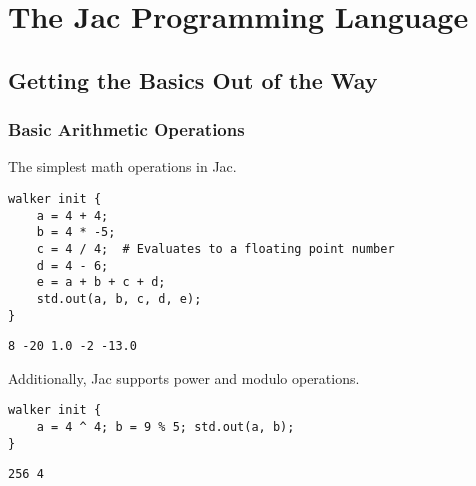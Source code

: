 \chapter{The Jac Programming Language}
\section{Getting the Basics Out of the Way}
\subsection{Basic Arithmetic Operations}
The simplest math operations in Jac.


\begin{lstlisting}[caption={Basic arithmetic operations}]
walker init {
    a = 4 + 4;
    b = 4 * -5;
    c = 4 / 4;  # Evaluates to a floating point number
    d = 4 - 6;
    e = a + b + c + d;
    std.out(a, b, c, d, e);
}
    \end{lstlisting}

\begin{lstlisting}[language=shell]
8 -20 1.0 -2 -13.0
        \end{lstlisting}


Additionally, Jac supports power and modulo operations.

\begin{lstlisting}[caption={Additional arithmetic operations}]
walker init {
    a = 4 ^ 4; b = 9 % 5; std.out(a, b);
}
    \end{lstlisting}

\begin{lstlisting}[language=shell]
256 4
        \end{lstlisting}
